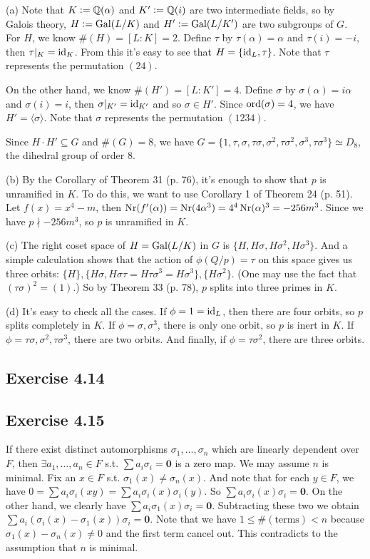 \documentclass[../Marcus.tex]{subfiles}
\begin{document}
(a) Note that $K:=\mathbb{Q}(\alpha)$ and $K':=\mathbb{Q}(i)$ are two intermediate fields, so by Galois theory, $H:=\operatorname{Gal}(L/K)$ and $H':=\operatorname{Gal}(L/K')$ are two subgroups of $G$.
For $H$, we know $\#(H)=[L:K]=2$. Define $\tau$ by $\tau(\alpha)=\alpha$ and $\tau(i)=-i$, then $\tau|_K=\operatorname{id}_K$. From this it's easy to see that $H=\{\operatorname{id}_L,\tau\}$. Note that $\tau$ represents the permutation $(24)$.

On the other hand, we know $\#(H')=[L:K']=4$. Define $\sigma$ by $\sigma(\alpha)=i\alpha$ and $\sigma(i)=i$, then $\sigma|_{K'}=\operatorname{id}_{K'}$ and so $\sigma\in H'$. Since $\operatorname{ord}(\sigma)=4$, we have $H'=\langle\sigma\rangle$. Note that $\sigma$ represents the permutation $(1234)$.

Since $H\cdot H'\subseteq G$ and $\#(G)=8$, we have $G=\{1,\tau,\sigma,\tau\sigma,\sigma^2,\tau\sigma^2,\sigma^3,\tau\sigma^3\}\simeq D_8$, the dihedral group of order $8$.

(b) By the Corollary of Theorem 31 (p. 76), it's enough to show that $p$ is unramified in $K$. To do this, we want to use Corollary 1 of Theorem 24 (p. 51). Let $f(x)=x^4-m$, then $\operatorname{Nr}(f'(\alpha))=\operatorname{Nr}(4\alpha^3)=4^4\operatorname{Nr}(\alpha)^3=-256m^3$. Since we have $p\nmid -256m^3$, so $p$ is unramified in $K$. 

(c) The right coset space of $H=\operatorname{Gal}(L/K)$ in $G$ is $\{H,H\sigma,H\sigma^2,H\sigma^3\}$. And a simple calculation shows that the action of $\phi(Q/p)=\tau$ on this space gives us three orbits: $\{H\},\{H\sigma,H\sigma\tau=H\tau\sigma^3=H\sigma^3\},\{H\sigma^2\}$. (One may use the fact that $(\tau\sigma)^2=(1)$.) So by Theorem 33 (p. 78), $p$ splits into three primes in $K$.

(d) It's easy to check all the cases. If $\phi=1=\operatorname{id}_L$, then there are four orbits, so $p$ splits completely in $K$. If $\phi=\sigma,\sigma^3$, there is only one orbit, so $p$ is inert in $K$. If $\phi=\tau\sigma,\sigma^2,\tau\sigma^3$, there are two orbits. And finally, if $\phi=\tau\sigma^2$, there are three orbits.

\subsection*{Exercise 4.14}

\subsection*{Exercise 4.15}

If there exist distinct automorphisms $\sigma_1,\ldots,\sigma_n$ which are linearly dependent over $F$, then $\exists a_1,\ldots,a_n\in F$ s.t. $\sum a_i\sigma_i=\mathbf{0}$ is a zero map. We may assume $n$ is minimal. Fix an $x\in F$ s.t. $\sigma_1(x)\neq\sigma_n(x)$. And note that for each $y\in F$, we have $0=\sum a_i\sigma_i(xy)=\sum a_i\sigma_i(x)\sigma_i(y)$. So $\sum a_i\sigma_i(x)\sigma_i=\mathbf{0}$. On the other hand, we clearly have $\sum a_i\sigma_1(x)\sigma_i=\mathbf{0}$. Subtracting these two we obtain $\sum a_i(\sigma_i(x)-\sigma_1(x))\sigma_i=\mathbf{0}$. Note that we have $1\leq\#(\text{terms})<n$ because $\sigma_1(x)-\sigma_n(x)\neq 0$ and the first term cancel out. This contradicts to the assumption that $n$ is minimal.
\end{document}
